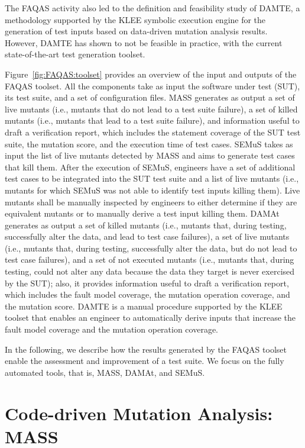 The FAQAS activity also led to the definition and feasibility study of DAMTE, a methodology supported by the KLEE symbolic execution engine for the generation of test inputs based on data-driven mutation analysis results. However, DAMTE has shown to not be feasible in practice, with the current state-of-the-art test generation toolset.

Figure~\ref{fig:FAQAS:toolset} provides an overview of the input and outputs of the FAQAS toolset. All the components take as input the software under test (SUT), its test suite, and a set of configuration files.
MASS generates as output a set of live mutants (i.e., mutants that do not lead to a test suite failure), a set of killed mutants (i.e., mutants that lead to a test suite failure), and information useful to draft a verification report, which includes the statement coverage of the SUT test suite, the mutation score, and the execution time of test cases.
SEMuS takes as input the list of live mutants detected by MASS and aims to generate test cases that kill them. After the
 execution of SEMuS, engineers have a set of additional test cases to be integrated into the SUT test suite and a list of live mutants (i.e., mutants for which SEMuS was not able to identify test inputs killing them). Live mutants shall be manually inspected by engineers to either determine if they are equivalent mutants or to manually derive a test input killing them.
 DAMAt generates as output a set of killed mutants (i.e., mutants that, during testing, successfully alter the data, and lead to test case failures), a set of live mutants (i.e., mutants that, during testing, successfully alter the data, but do not lead to test case failures), and a set of not executed mutants (i.e., mutants that, during testing, could not alter any data because the data they target is never exercised by the SUT); also, it provides information useful to draft a verification report, which includes the fault model coverage, the mutation operation coverage, and the mutation score.
 DAMTE is a manual procedure supported by the KLEE toolset that enables an engineer to automatically derive inputs that increase the fault model coverage and the mutation operation coverage.

In the following, we describe how the results generated by the FAQAS toolset enable the assessment and improvement of a test suite.
We focus on the fully automated tools, that is, MASS, DAMAt, and SEMuS.


\section{Code-driven Mutation Analysis: MASS}
\label{sec:meth:mass}

